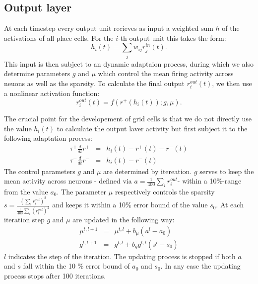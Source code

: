 \documentclass[a4paper, 12pt]{article}
\begin{document}
\subsection{Output layer}
At each timestep every output unit recieves as input a weighted sum $h$ of the activations of all place cells. For the $i$-th output unit this takes the form: 
	\begin{equation}
	h_i(t)=\sum_jw_{ij}r_j^{in}(t).
	\end{equation}
This input is then subject to an dynamic adaptaion process, during which we also determine parameters $g$ and $\mu$ which control the mean firing activity across neuons as well as the sparsity. To calculate the final output $r_i^{out}(t)$, we then use a nonlinear activation function:
	\begin{equation}
	r_i^{out}(t) = f(r^+(h_i(t)); g,\mu).
	\end{equation}

\noindent The crucial point for the developement of grid cells is that we do not directly use the value $h_i(t)$ to calculate the output laver activity but first subject it to the following adaptation process: 
	\begin{eqnarray}
	\tau^+\frac{d}{dt}r^+ &=& h_i(t)-r^+(t)-r^-(t)\\
	\tau^-\frac{d}{dt}r^- &=& h_i(t)-r^-(t)
	\end{eqnarray}
The control parameters $g$ and $\mu$ are determined by itereation. $g$ serves to keep the mean activity across neurons - defined via $a= \frac{1}{400}\sum_ir_i^{out}$- within a 10\%-range from the value $a_0$. The parameter $\mu$ respectively controls the sparsity $s=\frac{(\sum_ir_i^{out})^2}{\frac{1}{400}\sum_i (r_i^{out})^2}$ and keeps it within a 10\% error bound of the value $s_0$. At each iteration step $g$ and $\mu$ are updated in the following way: 
	\begin{eqnarray}
	\mu^{t, l+1} &=& \mu^{t,l}+b_\mu(a^{l}-a_0)\\
	g^{t,l+1} &=& g^{t,l}+ b_gg^{t,l}(s^l-s_0)
	\end{eqnarray}
\noindent $l$ indicates the step of the iteration. The updating process is stopped if both $a$ and $s$ fall within the 10 \% error bound of $a_0$ and $s_0$. In any case the updating process stops after 100 iterations. 
	
\end{document}
